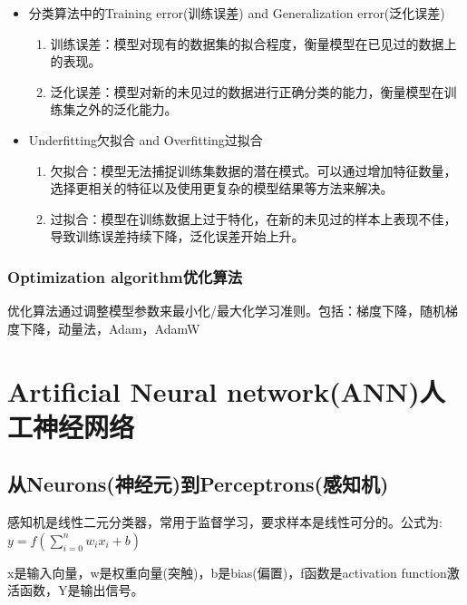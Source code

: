\documentclass[UTF8]{ctexart}
\begin{document}
\begin{itemize}
    \item 分类算法中的Training error(训练误差) and Generalization error(泛化误差)
    \begin{enumerate}
        \item 训练误差：模型对现有的数据集的拟合程度，衡量模型在已见过的数据上的表现。
        \item 泛化误差：模型对新的未见过的数据进行正确分类的能力，衡量模型在训练集之外的泛化能力。
    \end{enumerate}

    \item Underfitting欠拟合 and Overfitting过拟合
    \begin{enumerate}
        \item 欠拟合：模型无法捕捉训练集数据的潜在模式。可以通过增加特征数量，选择更相关的特征以及使用更复杂的模型结果等方法来解决。
        \item 过拟合：模型在训练数据上过于特化，在新的未见过的样本上表现不佳，导致训练误差持续下降，泛化误差开始上升。
    \end{enumerate}

\end{itemize}

\subsubsection{Optimization algorithm优化算法}
优化算法通过调整模型参数来最小化/最大化学习准则。包括：梯度下降，随机梯度下降，动量法，Adam，AdamW


\section{Artificial Neural network(ANN)人工神经网络}

\subsection{从Neurons(神经元)到Perceptrons(感知机)}

感知机是线性二元分类器，常用于监督学习，要求样本是线性可分的。公式为:$y=f(\sum\limits_{i=0}^{n} w_{i}x_{i}+b)$

x是输入向量，w是权重向量(突触)，b是bias(偏置)，f函数是activation function激活函数，Y是输出信号。
\end{document}
